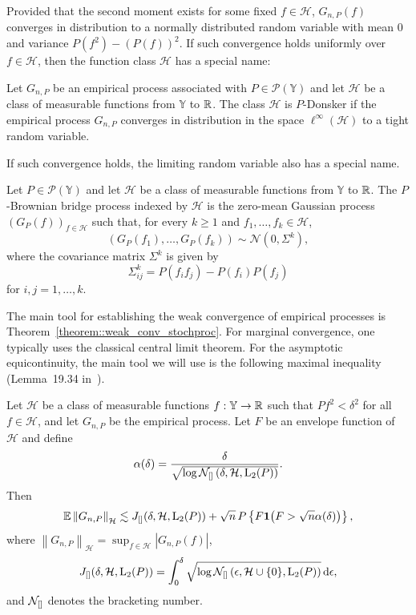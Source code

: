 Provided that the second moment exists for some fixed $f \in \mathcal{H}$, $G_{n,P}(f)$ converges in distribution to a normally distributed random variable with mean $0$ and variance $P(f^2) - (P(f))^2$. If such convergence holds
uniformly over $f \in \mathcal{H}$, then the function class $\mathcal{H}$ has a special name:
\begin{definition}\label{definition::donsker}
Let $G_{n,P}$ be an empirical process associated with $P \in \mathcal{P}(\mathbb{Y})$ and let $\mathcal{H}$ be a class of measurable functions from $\mathbb{Y}$ to $\mathbb{R}$. The class $\mathcal{H}$ is $P$-Donsker if the empirical process $G_{n,P}$ converges in distribution in the
space $\ell^\infty(\mathcal{H})$ to a tight random variable.
\end{definition}
If such convergence holds, the limiting random variable also has a special name.
\begin{definition}\label{def::brownbridge}
Let $P \in \mathcal{P}\left(\mathbb{Y}\right)$ and let $\mathcal{H}$ be a class of measurable functions from $\mathbb{Y}$ to $\mathbb{R}$. The $P$-Brownian bridge process indexed by $\mathcal{H}$ is the zero-mean
Gaussian process $(G_P(f))_{f \in \mathcal{H}}$ such that, for every $k \geq 1$ and
$f_1,\dots,f_k \in \mathcal{H}$,
\[
\left(G_P(f_1),\dots, G_P(f_k)\right) \sim \mathcal{N}\left(0, \Sigma^k\right),
\]
where the covariance matrix $\Sigma^k$ is given by
\[
\Sigma^k_{ij} = P(f_i f_j) - P(f_i)P(f_j)
\]
for $i,j = 1,\dots,k.$
\end{definition}
The main tool for establishing the weak convergence of empirical processes is Theorem~\ref{theorem::weak_conv_stochproc}. For marginal convergence, one typically uses the classical central limit theorem. For the asymptotic equicontinuity, the main tool we will use is the following maximal inequality (Lemma~19.34 in~\cite{van2000asymptotic}).
\begin{lemma}\label{lemma:maximalineq}
Let $\mathcal{H}$ be a class of measurable functions $f : \mathbb{Y}\to\mathbb{R}$ such that $Pf^2 < \delta^2$ for all $f \in \mathcal{H}$, and let $G_{n,P}$ be the empirical process. Let $F$ be an envelope function of $\mathcal{H}$ and define
\[
\alpha(\delta) = \frac{\delta}{\sqrt{\log \mathcal{N}_{[]}\left(\delta, \mathcal{H}, \mathrm{L}_2(P) \right)}}.
\]
Then
\[
\mathbb{E}\left\| G_{n,P} \right\|_{\mathcal{H}}
\lesssim
J_{[]} (\delta, \mathcal{H}, \mathrm{L}_2(P))
+ \sqrt{n}\,P\left\{F\mathbf{1}\big(F > \sqrt{n}\alpha(\delta)\big) \right\},
\]
where $\left\|G_{n,P} \right\|_{\mathcal{H}} = \sup_{f \in \mathcal{H}} \left|G_{n,P}(f) \right|$,
\[
J_{[]} (\delta, \mathcal{H}, \mathrm{L}_2(P))
= \int_0^\delta \sqrt{\log \mathcal{N}_{[]}\left(\epsilon, \mathcal{H}\cup\{0\}, \mathrm{L}_2(P) \right)}\,\mathrm{d}\epsilon,
\]
and $\mathcal{N}_{[]}$ denotes the bracketing number.
\end{lemma}
